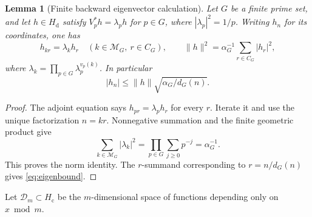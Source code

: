 \documentclass[11pt]{article}
\newtheorem{lemma}[theorem]{Lemma}
\theoremstyle{remark}
\newcommand{\Hd}{H_{\mathrm d}}
\newcommand{\Hc}{H_{\mathrm c}}
\newcommand{\D}{\mathcal D}
\begin{document}
\begin{lemma}[Finite backward eigenvector calculation]\label{lem:eigen}
Let $G$ be a finite prime set, and let $h\in\Hd$ satisfy
$V_p^*h=\lambda_ph$ for $p\in G$, where $|\lambda_p|^2=1/p$.
Writing $h_n$ for its coordinates, one has
\[
 h_{kr}=\lambda_k h_r\quad(k\in\mathcal M_G,\ r\in C_G),\qquad
 \|h\|^2=\alpha_G^{-1}\sum_{r\in C_G}|h_r|^2,
\]
where $\lambda_k=\prod_{p\in G}\lambda_p^{v_p(k)}$.  In particular
\begin{equation}\label{eq:eigenbound}
 |h_n|\leq\|h\|\sqrt{\alpha_G/d_G(n)}.
\end{equation}
\end{lemma}
\begin{proof}
The adjoint equation says $h_{pr}=\lambda_ph_r$ for every $r$.
Iterate it and use the unique factorization $n=kr$.
Nonnegative summation and the finite geometric product give
\[
 \sum_{k\in\mathcal M_G}|\lambda_k|^2
 =\prod_{p\in G}\sum_{j\geq0}p^{-j}=\alpha_G^{-1}.
\]
This proves the norm identity.  The $r$-summand corresponding to
$r=n/d_G(n)$ gives \eqref{eq:eigenbound}.
\end{proof}

Let $\D_m\subset\Hc$ be the $m$-dimensional space of functions depending
only on $x\bmod m$.
\end{document}
